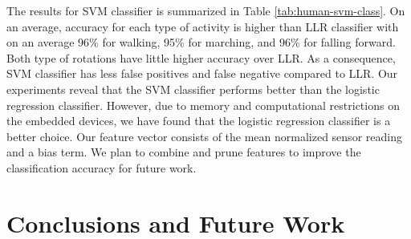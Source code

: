 \documentclass{IEEEtran}
\begin{document}
%

The results for SVM classifier is summarized in Table \ref{tab:human-svm-class}. On an average, 
accuracy for each type of activity is higher than LLR classifier with on an average 96\% for 
walking, 95\% for marching, and 96\% for falling forward. Both type of rotations have little higher accuracy over LLR. As a consequence, SVM classifier has less false positives and false negative compared to LLR.  Our experiments reveal that the SVM classifier performs better than the logistic regression classifier. However, due to memory and 
computational restrictions on the embedded devices, we have found that the logistic 
regression classifier is a better choice.  Our feature vector consists of the mean normalized sensor 
reading and a bias term. We plan to combine and prune features to improve the classification 
accuracy for future work.  




\section{Conclusions and Future Work}
\end{document}
